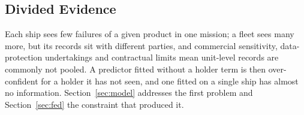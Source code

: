 \subsection{Divided Evidence}
Each ship sees few failures of a given product in one mission; a fleet sees many
more, but its records sit with different parties, and commercial sensitivity,
data-protection undertakings and contractual limits mean unit-level records are
commonly not pooled. A predictor fitted without a holder term is then
over-confident for a holder it has not seen, and one fitted on a single ship has
almost no information.
Section~\ref{sec:model} addresses the first problem and Section~\ref{sec:fed} the
constraint that produced it.
